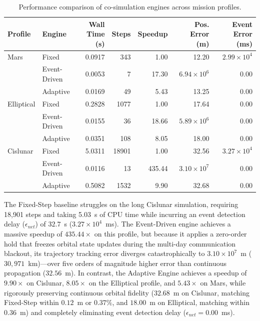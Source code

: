 \documentclass[a4paper,fleqn]{cas-sc}
\begin{document}
\begin{table}[htbp]
\centering
\caption{Performance comparison of co-simulation engines across mission profiles.}
\label{tab:comparison}
\footnotesize
\begin{tabular}{llrrrrr}
\toprule
\textbf{Profile} & \textbf{Engine} & \textbf{Wall Time (s)} & \textbf{Steps} & \textbf{Speedup} & \textbf{Pos. Error (m)} & \textbf{Event Error (ms)} \\
\midrule
Mars & Fixed & 0.0917 & 343 & 1.00 & 12.20 & $2.99 \times 10^4$ \\
 & Event-Driven & 0.0053 & 7 & 17.30 & $6.94 \times 10^6$ & 0.00 \\
 & Adaptive & 0.0169 & 49 & 5.43 & 13.25 & 0.00 \\
\midrule
Elliptical & Fixed & 0.2828 & 1077 & 1.00 & 17.64 & 0.00 \\
 & Event-Driven & 0.0155 & 36 & 18.66 & $5.89 \times 10^6$ & 0.00 \\
 & Adaptive & 0.0351 & 108 & 8.05 & 18.00 & 0.00 \\
\midrule
Cislunar & Fixed & 5.0311 & 18901 & 1.00 & 32.56 & $3.27 \times 10^4$ \\
 & Event-Driven & 0.0116 & 13 & 435.44 & $3.10 \times 10^7$ & 0.00 \\
 & Adaptive & 0.5082 & 1532 & 9.90 & 32.68 & 0.00 \\
\bottomrule
\end{tabular}
\end{table}

The Fixed-Step baseline struggles on the long Cislunar simulation, requiring 18,901 steps and taking 5.03~s of CPU time while incurring an event detection delay ($\epsilon_{net}$) of $32.7$~s ($3.27 \times 10^4$~ms). The Event-Driven engine achieves a massive speedup of $435.44\times$ on this profile, but because it applies a zero-order hold that freezes orbital state updates during the multi-day communication blackout, its trajectory tracking error diverges catastrophically to $3.10 \times 10^7$~m ($30,971$~km)---over five orders of magnitude higher error than continuous propagation ($32.56$~m). In contrast, the Adaptive Engine achieves a speedup of $9.90\times$ on Cislunar, $8.05\times$ on the Elliptical profile, and $5.43\times$ on Mars, while rigorously preserving continuous orbital fidelity ($32.68$~m on Cislunar, matching Fixed-Step within $0.12$~m or $0.37\%$, and $18.00$~m on Elliptical, matching within $0.36$~m) and completely eliminating event detection delay ($\epsilon_{net} = 0.00$~ms).
\end{document}
